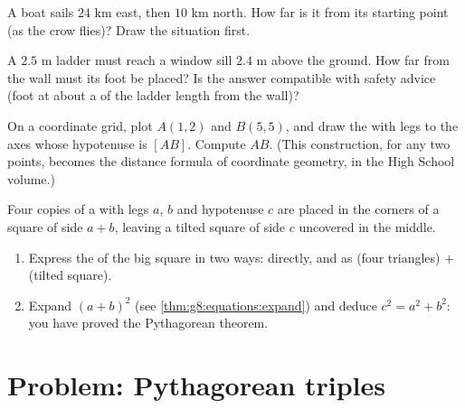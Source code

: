 \begin{exercise}[$\star\star$]\label{exo:g8:pythagoras:8}
A boat sails $24$ km east, then $10$ km north. How far is it from its
starting point (as the crow flies)? Draw the situation first.
\end{exercise}

\begin{exercise}[$\star\star$]\label{exo:g8:pythagoras:9}
A $2.5$ m ladder must reach a window sill $2.4$ m above the ground.
How far from the wall must its foot be placed? Is the answer
compatible with safety advice (foot at about a  of the ladder
length from the wall)?
\end{exercise}

\begin{exercise}[$\star\star$]\label{exo:g8:pythagoras:10}
On a coordinate grid, plot $A(1, 2)$ and $B(5, 5)$, and draw the
 with legs  to the axes whose hypotenuse is
$[AB]$. Compute $AB$. (This construction, for any two points, becomes
the distance formula of coordinate geometry, in the High School
volume.)
\end{exercise}

\begin{exercise}[$\star\star\star$]\label{exo:g8:pythagoras:11}
Four copies of a  with legs $a$, $b$ and hypotenuse $c$
are placed in the corners of a square of side $a + b$, leaving a
tilted square of side $c$ uncovered in the middle.
\begin{enumerate}
  \item Express the  of the big square in two ways: directly, and
        as (four triangles) $+$ (tilted square).
  \item Expand $(a + b)^2$ (see \cref{thm:g8:equations:expand}) and
        deduce $c^2 = a^2 + b^2$: you have proved the Pythagorean
        theorem.
\end{enumerate}
\end{exercise}

\section{Problem: Pythagorean triples}

